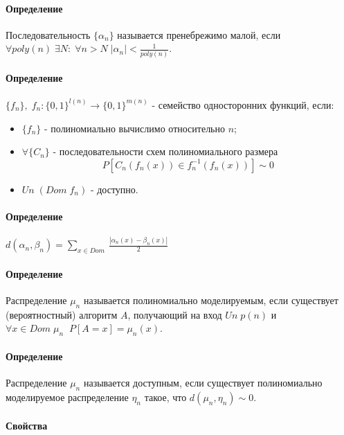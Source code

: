 \documentclass[12pt, a4paper]{article}
\newcommand{\dom}{Dom \;}
\newcommand{\uniform}{Un \;}
\newcommand{\bool}{\{0, 1\}}
\begin{document}
\paragraph{Определение} Последовательность $\{\alpha_n\}$ называется пренебрежимо малой, если $\forall poly(n) \; \exists N : \; \forall n > N \; |\alpha_n| < \frac{1}{poly(n)}$.

\paragraph{Определение} $\{f_n\}, \; f_n : \bool^{l(n)} \rightarrow \bool^{m(n)}$ - семейство односторонних функций, если:

\begin{itemize}
 \item $\{f_n\}$ - полиномиально вычислимо относительно $n$;
 \item $\forall \{C_n\}$ - последовательности схем полиномиального размера
 \[
  P[C_n(f_n(x)) \in f_n^{-1}(f_n(x))] \sim 0
 \]
 \item  $\uniform(\dom f_n)$ - доступно.

\end{itemize}

\paragraph{Определение} $d(\alpha_n, \beta_n) = \sum\limits_{x \in \dom} \frac{|\alpha_n(x) - \beta_n(x)|}{2}$

\paragraph{Определение} Распределение $\mu_n$ называется полиномиально моделируемым, если существует (вероятностный) алгоритм $A$, получающий на вход $\uniform p(n)$ и $\forall x \in \dom \mu_n \; \; P[A = x] = \mu_n(x)$.

\paragraph{Определение} Распределение $\mu_n$ называется доступным, если существует полиномиально моделируемое распределение $\eta_n$ такое, что $d(\mu_n, \eta_n) \sim 0$.

\paragraph{Свойства}
\end{document}
